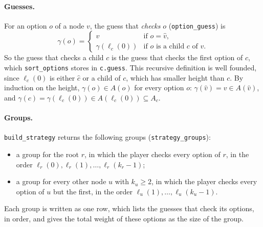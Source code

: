 \documentclass[11pt]{article}
\newcommand{\code}[1]{\texttt{#1}}
\begin{document}
\paragraph{Guesses.}
For an option $o$ of a node $v$, the guess that \emph{checks} $o$
(\code{option\_guess}) is
\[
  \gamma(o) =
  \begin{cases}
    v & \text{if } o = \hat v,\\
    \gamma(\ell_c(0)) & \text{if } o \text{ is a child } c \text{ of } v.
  \end{cases}
\]
So the guess that checks a child $c$ is the guess that checks the first option of
$c$, which \code{sort\_options} stores in \code{c.guess}. This recursive
definition is well founded, since $\ell_c(0)$ is either $\hat c$ or a child of
$c$, which has smaller height than $c$. By induction on the height,
$\gamma(o) \in A(o)$ for every option $o$: $\gamma(\hat v) = v \in A(\hat v)$, and
$\gamma(c) = \gamma(\ell_c(0)) \in A(\ell_c(0)) \subseteq A_c$.

\paragraph{Groups.}
\code{build\_strategy} returns the following groups (\code{strategy\_groups}):
\begin{itemize}
  \item a group for the root $r$, in which the player checks every option of $r$,
    in the order $\ell_r(0), \ell_r(1), \dots, \ell_r(k_r - 1)$;
  \item a group for every other node $u$ with $k_u \ge 2$, in which the player
    checks every option of $u$ but the first, in the order
    $\ell_u(1), \dots, \ell_u(k_u - 1)$.
\end{itemize}
Each group is written as one row, which lists the guesses that check its options,
in order, and gives the total weight of these options as the size of the group.
\end{document}
